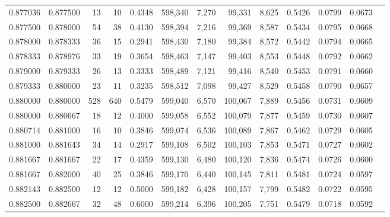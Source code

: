 \begin{tabular}{rrrrrrrrrrrrr}
0.877036 & 0.877500 &    13 &  10 &                                     0.4348 & 598,340 &   7,270 &  99,331 &   8,625 & 0.5426 & 0.0799 & 0.0673 \\
0.877500 & 0.878000 &    54 &  38 &                                     0.4130 & 598,394 &   7,216 &  99,369 &   8,587 & 0.5434 & 0.0795 & 0.0668 \\
0.878000 & 0.878333 &    36 &  15 &                                     0.2941 & 598,430 &   7,180 &  99,384 &   8,572 & 0.5442 & 0.0794 & 0.0665 \\
0.878333 & 0.878976 &    33 &  19 &                                     0.3654 & 598,463 &   7,147 &  99,403 &   8,553 & 0.5448 & 0.0792 & 0.0662 \\
0.879000 & 0.879333 &    26 &  13 &                                     0.3333 & 598,489 &   7,121 &  99,416 &   8,540 & 0.5453 & 0.0791 & 0.0660 \\
0.879333 & 0.880000 &    23 &  11 &                                     0.3235 & 598,512 &   7,098 &  99,427 &   8,529 & 0.5458 & 0.0790 & 0.0657 \\
0.880000 & 0.880000 &   528 & 640 &                                     0.5479 & 599,040 &   6,570 & 100,067 &   7,889 & 0.5456 & 0.0731 & 0.0609 \\
0.880000 & 0.880667 &    18 &  12 &                                     0.4000 & 599,058 &   6,552 & 100,079 &   7,877 & 0.5459 & 0.0730 & 0.0607 \\
0.880714 & 0.881000 &    16 &  10 &                                     0.3846 & 599,074 &   6,536 & 100,089 &   7,867 & 0.5462 & 0.0729 & 0.0605 \\
0.881000 & 0.881643 &    34 &  14 &                                     0.2917 & 599,108 &   6,502 & 100,103 &   7,853 & 0.5471 & 0.0727 & 0.0602 \\
0.881667 & 0.881667 &    22 &  17 &                                     0.4359 & 599,130 &   6,480 & 100,120 &   7,836 & 0.5474 & 0.0726 & 0.0600 \\
0.881667 & 0.882000 &    40 &  25 &                                     0.3846 & 599,170 &   6,440 & 100,145 &   7,811 & 0.5481 & 0.0724 & 0.0597 \\
0.882143 & 0.882500 &    12 &  12 &                                     0.5000 & 599,182 &   6,428 & 100,157 &   7,799 & 0.5482 & 0.0722 & 0.0595 \\
0.882500 & 0.882667 &    32 &  48 &                                     0.6000 & 599,214 &   6,396 & 100,205 &   7,751 & 0.5479 & 0.0718 & 0.0592 \\

\end{tabular}
